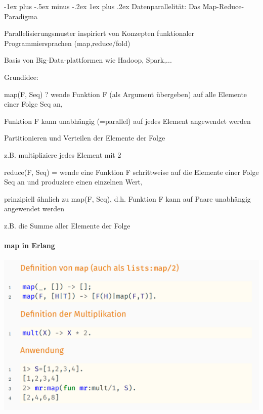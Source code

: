 \documentclass[10pt]{article}
\makeatletter
\renewcommand{\subsubsection}{\@startsection{subsubsection}{3}{0mm}%
                                {-1ex plus -.5ex minus -.2ex}%
                                {1ex plus .2ex}%
                                {\normalfont\small\bfseries}}
\makeatother
\begin{document}
\subsubsection{Datenparallelität: Das Map-Reduce-Paradigma}
\begin{itemize*}
  \item Parallelisierungsmuster inspiriert von Konzepten funktionaler Programmiersprachen (map,reduce/fold)
  \item Basis von Big-Data-plattformen wie Hadoop, Spark,...
  \item Grundidee:
  \begin{itemize*}
    \item map(F, Seq) ? wende Funktion F (als Argument übergeben) auf alle Elemente einer Folge Seq an,
    \begin{itemize*}
      \item Funktion F kann unabhängig (=parallel) auf jedes Element angewendet werden
      \item Partitionieren und Verteilen der Elemente der Folge
      \item z.B. multipliziere jedes Element mit 2
    \end{itemize*}
    \item reduce(F, Seq) = wende eine Funktion F schrittweise auf die Elemente einer Folge Seq an und produziere einen einzelnen Wert,
    \begin{itemize*}
      \item prinzipiell ähnlich zu map(F, Seq), d.h. Funktion F kann auf Paare unabhängig angewendet werden
      \item z.B. die Summe aller Elemente der Folge
    \end{itemize*}
  \end{itemize*}
\end{itemize*}

\paragraph{map in Erlang}

\begin{center}
  \includegraphics[width=0.4\linewidth]{Assets/Programmierparadigmen-erlang-map}
\end{center}
\end{document}
